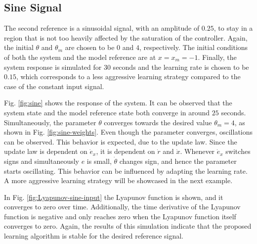 \subsection{Sine Signal}
\label{sec:sine}
The second reference is a sinusoidal signal, with an amplitude of $0.25$, to stay in a region that is not too heavily affected by the saturation of the controller. Again, the initial $\theta$ and $\theta_m$ are chosen to be $0$ and $4$, respectively. The initial conditions of both the system and the model reference are at $x=x_m=-1$. Finally, the system response is simulated for $30$ seconds and the learning rate is chosen to be $0.15$, which corresponds to a less aggressive learning strategy compared to the case of the constant input signal.

Fig. \ref{fig:sine} shows the response of the system. It can be observed that the system state and the model reference state both converge in around $25$ seconds. Simultaneously, the parameter $\theta$ converges towards the desired value $\theta_m = 4$, as shown in Fig. \ref{fig:sine-weights}. Even though the parameter converges, oscillations can be observed. This behavior is expected, due to the update law. Since the update law is dependent on $\dot e_x$, it is dependent on $\dot r$ and $\dot x$. Whenever $\dot e_x$ switches signs and simultaneously $e$ is small, $\dot \theta$ changes sign, and hence the parameter starts oscillating. This behavior can be influenced by adapting the learning rate. A more aggressive learning strategy will be showcased in the next example.

In Fig. \ref{fig:Lyapunov-sine-input} the Lyapunov function is shown, and it converges to zero over time. Additionally, the time derivative of the Lyapunov function is negative and only reaches zero when the Lyapunov function itself converges to zero. Again, the results of this simulation indicate that the proposed learning algorithm is stable for the desired reference signal.

